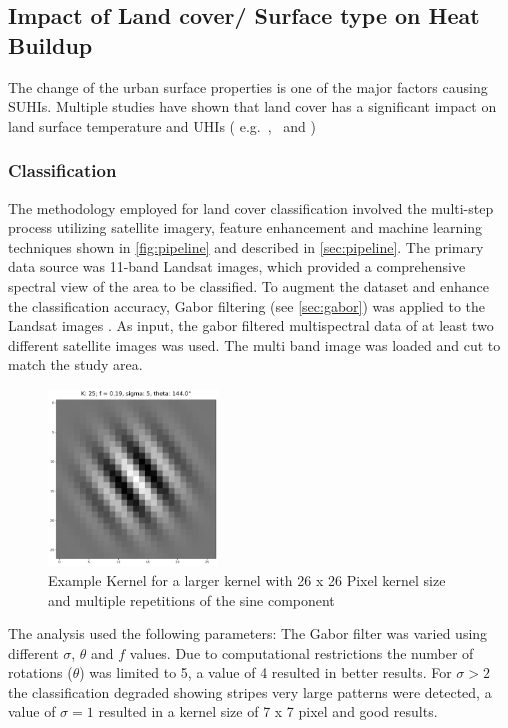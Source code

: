 \documentclass[12pt,a4paper, english]{article}
\begin{document}
    \subsection{Impact of Land cover/ Surface type on Heat Buildup}
      The change of the urban surface properties is one of the major factors causing \glspl{SUHI}.  
      Multiple studies have shown that land cover has a significant impact on land surface temperature and \glspl{UHI} ( e.g.~\autocite{Karakus2019},~\cite{Weng2004} and \cite{Stewart2011})
    \subsubsection{Classification }\label{sec:classification}
      The methodology employed for land cover classification involved the multi-step process utilizing satellite imagery, feature enhancement and machine learning techniques shown in \cref{fig:pipeline} and described in \cref{sec:pipeline}.
      The primary data source was 11-band Landsat images, which provided a comprehensive spectral view of the area to be classified.
      To augment the dataset and enhance the classification accuracy, Gabor filtering (see \cref{sec:gabor}) was applied to the Landsat images .
      As input, the gabor filtered multispectral data of at least two different satellite images was used.
      The multi band image was loaded and cut to match the study area. 
      \begin{figure}
       \begin{center}
         \includegraphics[width=0.4\textwidth]{img/KLarge.png}
       \end{center}
       \caption{Example Kernel for a larger kernel with 26 x 26 Pixel kernel size and multiple repetitions of the sine component}\label{fig:largeKernel}
      \end{figure}
    The analysis used the following parameters: 
    The Gabor filter was varied using different $\sigma$, $\theta$ and $f$ values.
    Due to computational restrictions the number of rotations ($\theta$) was limited to 5, a value of 4 resulted in better results. 
    For $\sigma > 2$ the classification degraded showing stripes very large patterns were detected, a value of $\sigma = 1$ resulted in a kernel size of 7 x 7 pixel and good results.
\end{document}
